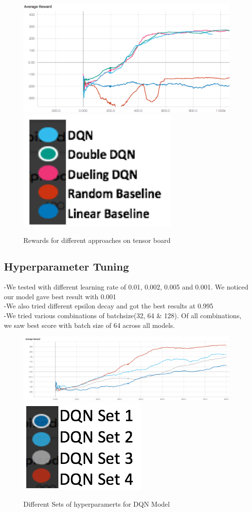  
\begin{figure}[!ht]
\centering
\includegraphics[scale=0.75,width=0.75\columnwidth]{figures/Picture1.png}%
\includegraphics[scale=0.15,width=0.15\columnwidth]{figures/Legend.png}%
\caption{ Rewards for different approaches on tensor board}%
\label{fig:Visualization}%
\end{figure}



\subsection{ Hyperparameter  Tuning}
-We tested with different learning rate of 0.01, 0.002, 0.005 and 0.001. We noticed our model gave best result with 0.001\\
-We also tried different epsilon decay and got the best results at 0.995\\
-We tried various combinations of batchsize(32, 64 & 128). Of all combinations, we saw best score with batch size of 64 across all models. \\

\begin{figure}[!ht]
\centering
\includegraphics[scale=0.75,width=0.75\columnwidth]{figures/Hyperparameters1.png}%
\includegraphics[scale=0.15,width=0.15\columnwidth]{figures/Hyperparameters_legends1.png}%
\caption{ Different Sets of hyperparamerts for DQN Model}%
\label{fig:Visualization}%
\end{figure}



